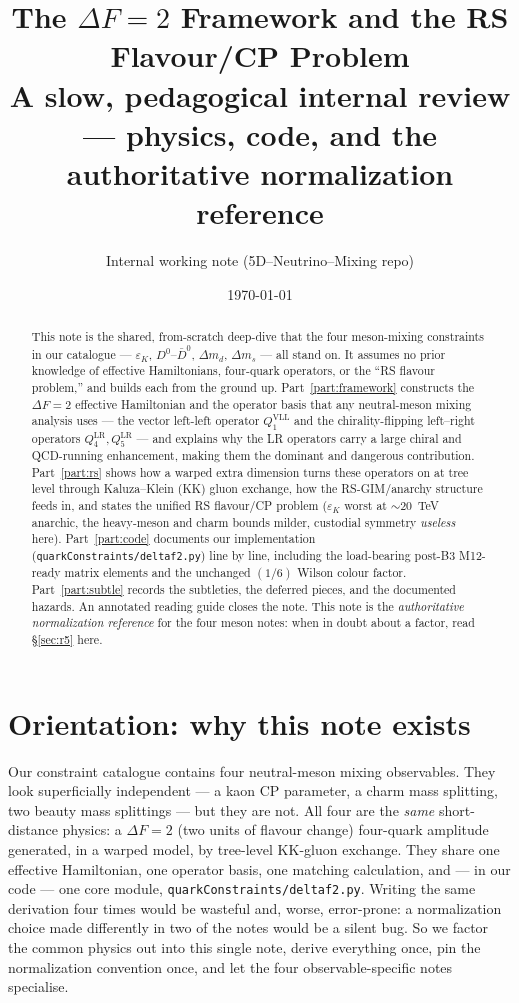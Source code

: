 \documentclass[11pt]{article}
\title{\bf The $\Delta F=2$ Framework and the RS Flavour/CP Problem\\[4pt]
\large A slow, pedagogical internal review --- physics, code, and the
authoritative normalization reference}
\author{Internal working note (5D--Neutrino--Mixing repo)}
\date{\today}
\newcommand{\eps}{\varepsilon}
\newcommand{\QVLL}{Q_1^{\mathrm{VLL}}}
\newcommand{\QLRfour}{Q_4^{\mathrm{LR}}}
\newcommand{\QLRfive}{Q_5^{\mathrm{LR}}}
\newcommand{\code}[1]{\texttt{#1}}
\theoremstyle{definition}
\begin{document}
\maketitle

\begin{abstract}
\noindent
This note is the shared, from-scratch deep-dive that the four meson-mixing
constraints in our catalogue --- $\eps_K$, $D^0$--$\bar D^0$, $\Delta m_d$,
$\Delta m_s$ --- all stand on. It assumes no prior knowledge of effective
Hamiltonians, four-quark operators, or the ``RS flavour problem,'' and builds
each from the ground up. Part~\ref{part:framework} constructs the $\Delta F=2$
effective Hamiltonian and the operator basis that any neutral-meson mixing
analysis uses --- the vector left-left operator $\QVLL$ and the
chirality-flipping left--right operators $\QLRfour,\QLRfive$ --- and explains
why the LR operators carry a large chiral and QCD-running enhancement, making
them the dominant and dangerous contribution. Part~\ref{part:rs} shows how a
warped extra dimension turns these operators on at tree level through
Kaluza--Klein (KK) gluon exchange, how the RS-GIM/anarchy structure feeds in,
and states the unified RS flavour/CP problem ($\eps_K$ worst at $\sim20$~TeV
anarchic, the heavy-meson and charm bounds milder, custodial symmetry
\emph{useless} here). Part~\ref{part:code} documents our implementation
(\code{quarkConstraints/deltaf2.py}) line by line, including the load-bearing
post-B3 M12-ready matrix elements and the unchanged $(1/6)$ Wilson colour factor.
Part~\ref{part:subtle}
records the subtleties, the deferred pieces, and the documented hazards. An
annotated reading guide closes the note. This note is the \emph{authoritative
normalization reference} for the four meson notes: when in doubt about a factor,
read \S\ref{sec:r5} here.
\end{abstract}

\tableofcontents

\part*{Orientation: why this note exists}

Our constraint catalogue contains four neutral-meson mixing observables. They
look superficially independent --- a kaon CP parameter, a charm mass splitting,
two beauty mass splittings --- but they are not. All four are the \emph{same}
short-distance physics: a $\Delta F=2$ (two units of flavour change)
four-quark amplitude generated, in a warped model, by tree-level KK-gluon
exchange. They share one effective Hamiltonian, one operator basis, one matching
calculation, and --- in our code --- one core module,
\code{quarkConstraints/deltaf2.py}. Writing the same derivation four times would
be wasteful and, worse, error-prone: a normalization choice made differently in
two of the notes would be a silent bug. So we factor the common physics out into
this single note, derive everything once, pin the normalization convention once,
and let the four observable-specific notes specialise.
\end{document}
